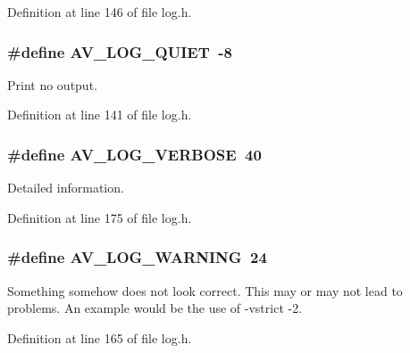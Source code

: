 Definition at line 146 of file log.\+h.

\subsubsection[{\texorpdfstring{A\+V\+\_\+\+L\+O\+G\+\_\+\+Q\+U\+I\+ET}{AV_LOG_QUIET}}]{\setlength{\rightskip}{0pt plus 5cm}\#define A\+V\+\_\+\+L\+O\+G\+\_\+\+Q\+U\+I\+ET~-\/8}\hypertarget{group__lavu__log__constants_ga11e329935b59b83ca722b66674f37fd4}{}\label{group__lavu__log__constants_ga11e329935b59b83ca722b66674f37fd4}
Print no output. 

Definition at line 141 of file log.\+h.

\subsubsection[{\texorpdfstring{A\+V\+\_\+\+L\+O\+G\+\_\+\+V\+E\+R\+B\+O\+SE}{AV_LOG_VERBOSE}}]{\setlength{\rightskip}{0pt plus 5cm}\#define A\+V\+\_\+\+L\+O\+G\+\_\+\+V\+E\+R\+B\+O\+SE~40}\hypertarget{group__lavu__log__constants_ga9b58b28e2d429b930b69db19877f76a8}{}\label{group__lavu__log__constants_ga9b58b28e2d429b930b69db19877f76a8}
Detailed information. 

Definition at line 175 of file log.\+h.

\subsubsection[{\texorpdfstring{A\+V\+\_\+\+L\+O\+G\+\_\+\+W\+A\+R\+N\+I\+NG}{AV_LOG_WARNING}}]{\setlength{\rightskip}{0pt plus 5cm}\#define A\+V\+\_\+\+L\+O\+G\+\_\+\+W\+A\+R\+N\+I\+NG~24}\hypertarget{group__lavu__log__constants_ga85b57516ca703cc47d9bbe5f4658c716}{}\label{group__lavu__log__constants_ga85b57516ca703cc47d9bbe5f4658c716}
Something somehow does not look correct. This may or may not lead to problems. An example would be the use of \textquotesingle{}-\/vstrict -\/2\textquotesingle{}. 

Definition at line 165 of file log.\+h.


